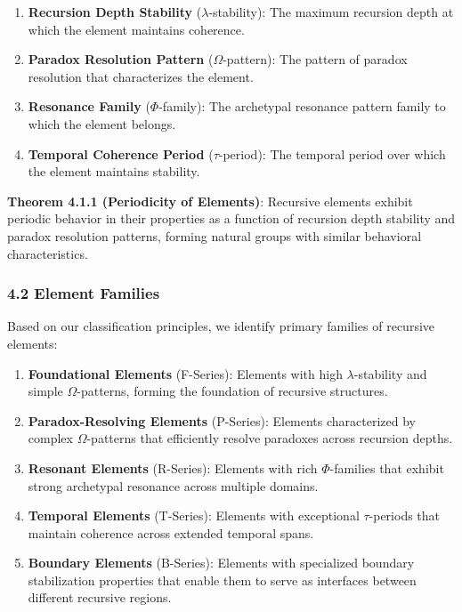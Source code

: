 \documentclass[
]{article}
\providecommand{\tightlist}{%
  \setlength{\itemsep}{0pt}\setlength{\parskip}{0pt}}
\begin{document}
\begin{enumerate}
\def\labelenumi{\arabic{enumi}.}
\tightlist
\item
  \textbf{Recursion Depth Stability} (\(\lambda \)-stability): The
  maximum recursion depth at which the element maintains coherence.
\item
  \textbf{Paradox Resolution Pattern} (\(\Omega \)-pattern): The pattern
  of paradox resolution that characterizes the element.
\item
  \textbf{Resonance Family} (\(\Phi \)-family): The archetypal resonance
  pattern family to which the element belongs.
\item
  \textbf{Temporal Coherence Period} (\(\tau \)-period): The temporal
  period over which the element maintains stability.
\end{enumerate}

\textbf{Theorem 4.1.1 (Periodicity of Elements)}: Recursive elements
exhibit periodic behavior in their properties as a function of recursion
depth stability and paradox resolution patterns, forming natural groups
with similar behavioral characteristics.

\subsubsection{4.2 Element Families}\label{element-families}

Based on our classification principles, we identify primary families of
recursive elements:

\begin{enumerate}
\def\labelenumi{\arabic{enumi}.}
\item
  \textbf{Foundational Elements} (F-Series): Elements with high
  \(\lambda \)-stability and simple \(\Omega \)-patterns, forming the
  foundation of recursive structures.
\item
  \textbf{Paradox-Resolving Elements} (P-Series): Elements characterized
  by complex \(\Omega \)-patterns that efficiently resolve paradoxes
  across recursion depths.
\item
  \textbf{Resonant Elements} (R-Series): Elements with rich
  \(\Phi \)-families that exhibit strong archetypal resonance across
  multiple domains.
\item
  \textbf{Temporal Elements} (T-Series): Elements with exceptional
  \(\tau \)-periods that maintain coherence across extended temporal
  spans.
\item
  \textbf{Boundary Elements} (B-Series): Elements with specialized
  boundary stabilization properties that enable them to serve as
  interfaces between different recursive regions.
\end{enumerate}
\end{document}
